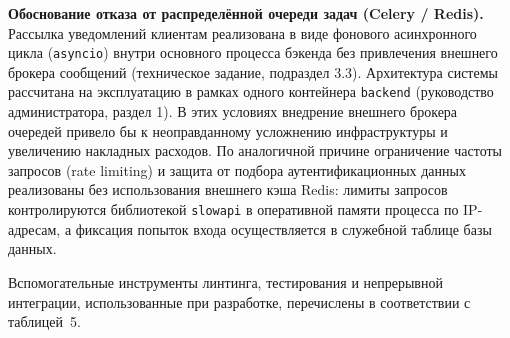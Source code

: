\textbf{Обоснование отказа от распределённой очереди задач (Celery /
Redis).} Рассылка уведомлений клиентам реализована в виде фонового
асинхронного цикла (\texttt{asyncio}) внутри основного процесса бэкенда
без привлечения внешнего брокера сообщений (техническое задание,
подраздел 3.3). Архитектура системы рассчитана на эксплуатацию в рамках
одного контейнера \texttt{backend} (руководство администратора,
раздел 1). В этих условиях внедрение внешнего брокера очередей привело
бы к неоправданному усложнению инфраструктуры и увеличению накладных
расходов. По аналогичной причине ограничение частоты запросов (rate
limiting) и защита от подбора аутентификационных данных реализованы без
использования внешнего кэша Redis: лимиты запросов контролируются
библиотекой \texttt{slowapi} в оперативной памяти процесса по
IP-адресам, а фиксация попыток входа осуществляется в служебной таблице
 базы данных.


Вспомогательные инструменты линтинга, тестирования и непрерывной
интеграции, использованные при разработке, перечислены в соответствии с таблицей~5.

